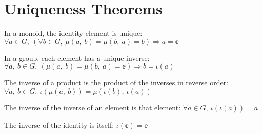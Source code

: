 \section{Uniqueness Theorems}

\begin{theorem}
    \label{theorem : id_unique}
    \leanok
    In a monoid, the identity element is unique:
    $\forall a \in G, ~(\forall b \in G, ~\mu(a,~ b) = \mu(b,~ a) = b)
    \Rightarrow a = \mathbb{e}$
  \end{theorem}

\begin{theorem}
    \label{theorem : inv_unique}
    \leanok
    In a group, each element has a unique inverse:
    $\forall a,~ b \in G,~ (\mu(a,~ b) = \mu(b,~ a) = \mathbb{e}) \Rightarrow b
     = \iota(a)$
  \end{theorem}

\begin{theorem}
  \label{theorem : inv_anticomm}
  \leanok
  The inverse of a product is the product of the inverses in reverse order:
  $\forall a,~ b \in G,~ \iota(\mu(a,~ b)) = \mu(\iota(b),~ \iota(a))$
\end{theorem}

\begin{theorem}
  \label{theorem : inv_inv}
  \leanok
  The inverse of the inverse of an element is that element:
  $\forall a \in G,~ \iota(\iota(a)) = a$
\end{theorem}

\begin{theorem}
  \label{theorem : inv_id}
  \leanok
  The inverse of the identity is itself:
  $\iota(\mathbb{e}) = \mathbb{e}$
\end{theorem}
